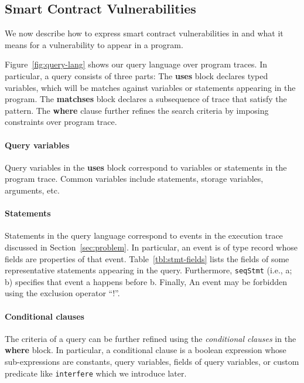 \subsection{Smart Contract Vulnerabilities}\label{sec:vul}
We now describe how to express smart contract vulnerabilities in \toolname and what it means for a vulnerability to appear in a program.


Figure~\ref{fig:query-lang} shows our  query language over program traces. In particular, a query consists of three parts: The \textbf{uses} block declares typed variables, which will be matches against variables or statements appearing in the program. The \textbf{matchses} block declares a subsequence of trace that satisfy the pattern. The \textbf{where} clause further refines the search criteria by imposing constraints over program trace. 
\paragraph{Query variables} Query variables in the \textbf{uses} block correspond to variables or statements in the program trace. Common variables include statements, storage variables, arguments, etc.

\paragraph{Statements} Statements in the query language correspond to events in the execution trace discussed in Section~\ref{sec:problem}. In particular, an event is of type record whose fields are properties of that event. Table~\ref{tbl:stmt-fields} lists the fields of some representative statements appearing in the query. Furthermore, \texttt{seqStmt} (i.e., a; b) specifies that event a happens before b. Finally, An event may be forbidden using the exclusion operator ``!''.

\paragraph{Conditional clauses} The criteria of a query can be further refined using the \emph{conditional clauses} in the \textbf{where} block. In particular, a conditional clause is a boolean expression whose sub-expressions are constants, query variables, fields of query variables, or custom predicate like \texttt{interfere} which we introduce later.

